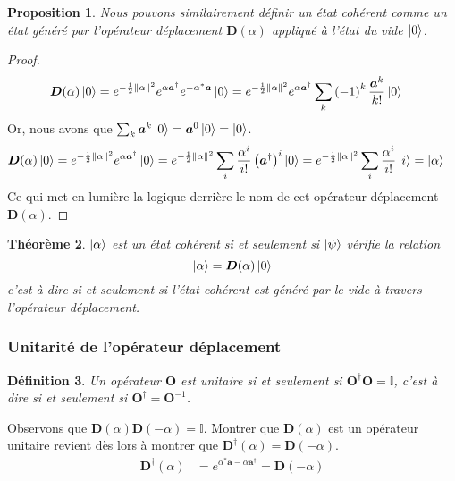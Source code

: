 \documentclass[11pt,oneside,a4paper]{article}
\newtheorem{theorem}{Théorème}[section]
\newtheorem{definition}[theorem]{Définition}
\newtheorem{property}[theorem]{Proposition}
\begin{document}
\begin{property}
  Nous pouvons similairement définir un état cohérent comme un état généré par l'opérateur déplacement $\bm{D}(\alpha)$ appliqué à l'état du vide $\ket{0}$.
\end{property}
\begin{proof}
  \begin{align}
    \bm{D}(\alpha)\ket{0} &=  e^{-\frac{1}{2}\norm{\alpha}^2}e^{\alpha\bm{a}^\dagger}e^{-\alpha^*\bm{a}}\ket{0} = e^{-\frac{1}{2}\norm{\alpha}^2}e^{\alpha\bm{a}^\dagger} \sum_k \left(-1\right)^k \frac{\bm{a}^k}{k!}\ket{0}
  \end{align}
  Or, nous avons que $\sum_k \bm{a}^k\ket{0} = \bm{a}^0\ket{0} = \ket{0}$.
  \begin{align}
    \bm{D}(\alpha)\ket{0} &= e^{-\frac{1}{2}\norm{\alpha}^2}e^{\alpha\bm{a}^\dagger}\ket{0} =  e^{-\frac{1}{2}\norm{\alpha}^2} \sum_i \frac{\alpha^i}{i!}\left(\bm{a}^\dagger\right)^i\ket{0} = e^{-\frac{1}{2}\norm{\alpha}^2} \sum_i \frac{\alpha^i}{i!}\ket{i} = \ket{\alpha}
  \end{align}
  Ce qui met en lumière la logique derrière le nom de cet opérateur déplacement $\bm{D}(\alpha)$.
\end{proof}

\begin{theorem}
  $\ket{\alpha}$ est un état cohérent si et seulement si $\ket{\psi}$ vérifie la relation
  \begin{equation*}
    \ket{\alpha}=\bm{D}(\alpha)\ket{0}
  \end{equation*}
  c'est à dire si et seulement si l'état cohérent est généré par le vide à travers l'opérateur déplacement.
\end{theorem}

\subsubsection{Unitarité de l'opérateur déplacement}

\begin{definition}
  Un opérateur $\bm{O}$ est unitaire si et seulement si $\bm{O}^\dagger\bm{O} = \mathbb{I}$, c'est à dire si et seulement si $\bm{O}^\dagger = \bm{O}^{-1}$.
\end{definition}

Observons que $\bm{D}(\alpha)\bm{D}(-\alpha) = \mathbb{I}$. Montrer que $\bm{D}(\alpha)$ est un opérateur unitaire revient dès lors à montrer que $\bm{D}^\dagger(\alpha) = \bm{D}(-\alpha)$.
\begin{align}
  \bm{D}^\dagger(\alpha) &= e^{\alpha^*\bm{a}-\alpha\bm{a}^\dagger} = \bm{D}(-\alpha) 
\end{align}
\end{document}
